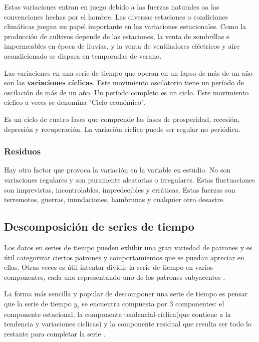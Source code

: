     Estas variaciones entran en juego debido a las fuerzas naturales oa las convenciones hechas por el hombre. Las diversas estaciones o condiciones climáticas juegan un papel 
    importante en las variaciones estacionales. Como la producción de cultivos depende de las estaciones, la venta de sombrillas e impermeables en época de lluvias, 
    y la venta de ventiladores eléctricos y aire acondicionado se dispara en temporadas de verano.

    Las variaciones en una serie de tiempo que operan en un lapso de más de un año son las \textbf{variaciones cíclicas}. Este movimiento oscilatorio tiene un período de oscilación de más de un año.
    Un período completo es un ciclo. Este movimiento cíclico a veces se denomina "Ciclo económico".

    Es un ciclo de cuatro fases que comprende las fases de prosperidad, recesión, depresión y recuperación. La variación cíclica puede ser regular no periódica.

    \subsubsection{Residuos}
    
    Hay otro factor que provoca la variación en la variable en estudio. No son variaciones regulares y son puramente aleatorias o irregulares. 
    Estas fluctuaciones son imprevistas, incontrolables, impredecibles y erráticas. Estas fuerzas son terremotos, guerras, inundaciones, hambrunas y cualquier otro desastre.

    \subsection{Descomposición de series de tiempo}
    Los datos en series de tiempo pueden exhibir una gran variedad de patrones y es útil categorizar ciertos patrones 
    y comportamientos que se puedan apreciar en ellas. Otras veces es útil intentar dividir la serie de tiempo en varios componentes,
    cada uno representando uno de los patrones subyacentes \cite{20}.

    La forma más sencilla y popular de descomponer una serie de tiempo es pensar que la serie de tiempo $y_t$ se encuentra compuesta por 
    3 componentes: el componente estacional, la componente tendencial-cíclica(que contiene a la tendencia y variaciones cíclicas) y la componente residual que resulta ser
    todo lo restante para completar la serie \cite{20}.

